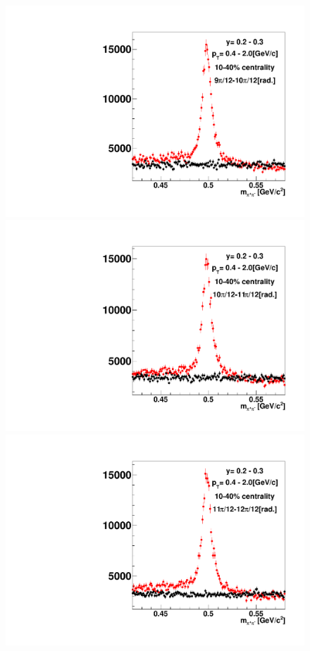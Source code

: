 \begin{figure}[h]
\includegraphics[width=0.14\linewidth]{chapterX/fig/ks_v1_sig/kf_ptslice0_cent1_ks_flow_phi10_rap2_check.pdf}
\includegraphics[width=0.14\linewidth]{chapterX/fig/ks_v1_sig/kf_ptslice0_cent1_ks_flow_phi11_rap2_check.pdf}
\includegraphics[width=0.14\linewidth]{chapterX/fig/ks_v1_sig/kf_ptslice0_cent1_ks_flow_phi12_rap2_check.pdf}


\end{figure}
